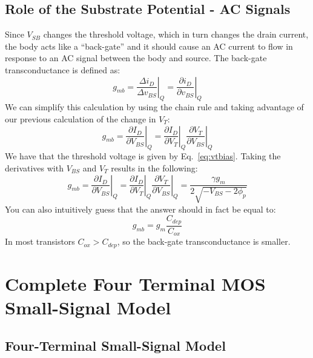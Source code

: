 \subsection{Role of the Substrate Potential - AC Signals}

Since $V_{SB}$ changes the threshold voltage, which in turn changes the drain current, the body acts like a ``back-gate” and it should cause an AC current to flow in response to an AC signal between the body and source.  The back-gate transconductance is defined as:
%
\begin{equation} 
	{g_{mb}} = {\left. {\frac{{\Delta {i_D}}}{{\Delta {v_{BS}}}}} \right|_Q} = {\left. {\frac{{\partial {i_D}}}{{\partial {v_{BS}}}}} \right|_Q} 
\end{equation}
%
We can simplify this calculation by using the chain rule and taking advantage of our previous calculation of the change in $V_T$:
%
\begin{equation}
	{g_{mb}} = {\left. {\frac{{\partial {I_D}}}{{\partial {V_{BS}}}}} \right|_Q} = {\left. {\frac{{\partial {I_D}}}{{\partial {V_{T}}}}} \right|_Q}{\left. {\frac{{\partial {V_{T}}}}{{\partial {V_{BS}}}}} \right|_Q}
\end{equation}
%
We have that the threshold voltage is given by Eq.~\ref{eq:vtbias}.  Taking the derivatives with $V_{BS}$ and $V_T$ results in the following:
%
\begin{equation}
	{g_{mb}} = {\left. {\frac{{\partial {I_D}}}{{\partial {V_{BS}}}}} \right|_Q} 
= {\left. {\frac{{\partial {I_D}}}{{\partial {V_{T}}}}} \right|_Q}{\left. {\frac{{\partial {V_{T}}}}{{\partial {V_{BS}}}}} \right|_Q} = \frac{{\gamma {g_m}}}{{2\sqrt { - {V_{BS}} - 2{\phi _p}} }}
\end{equation}
%
You can also intuitively guess that the answer should in fact be equal to:
%
\begin{equation}
	g_{mb} = g_m \frac{C_{dep}}{C_{ox}}
\end{equation}
%
In most transistors $C_{ox} > C_{dep}$, so the back-gate transconductance is smaller.   
 

\section{Complete Four Terminal MOS Small-Signal Model}


\subsection{Four-Terminal Small-Signal Model}

